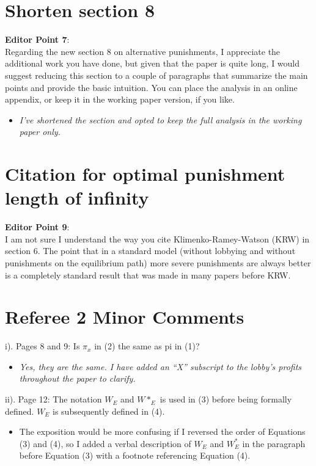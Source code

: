 \documentclass[12pt]{article}
\begin{document}
\section{Shorten section 8}
\label{sec:sec8}
\textbf{Editor Point 7}:\\
Regarding the new section 8 on alternative punishments, I appreciate the additional work you have done, but given that the paper is quite long, I would suggest reducing this section to a couple of paragraphs that summarize the main points and provide the basic intuition. You can place the analysis in an online appendix, or keep it in the working paper version, if you like. \\
\begin{itemize}
	\item \textit{I've shortened the section and opted to keep the full analysis in the working paper only.}
\end{itemize}

\section{Citation for optimal punishment length of infinity}
\textbf{Editor Point 9}:\\
I am not sure I understand the way you cite Klimenko-Ramey-Watson (KRW) in section 6. The point that in a standard model (without lobbying and without punishments on the equilibrium path) more severe punishments are always better is a completely standard result that was made in many papers before KRW.


\section{Referee 2 Minor Comments}
i).  Pages 8 and 9: Is $\pi_x$ in (2) the same as pi in (1)?
\begin{itemize}
	\item \textit{Yes, they are the same. I have added an ``X'' subscript to the lobby's profits throughout the paper to clarify.}
\end{itemize}

ii). Page 12: The notation $W_E$ and $W*_E$ is used in (3) before being formally defined. $W_E$ is subsequently defined in (4).
\begin{itemize}
	\item The exposition would be more confusing if I reversed the order of Equations (3) and (4), so I added a verbal description of $W_E$ and $W_E^*$ in the paragraph before Equation (3) with a footnote referencing Equation (4).
\end{itemize}
\end{document}
